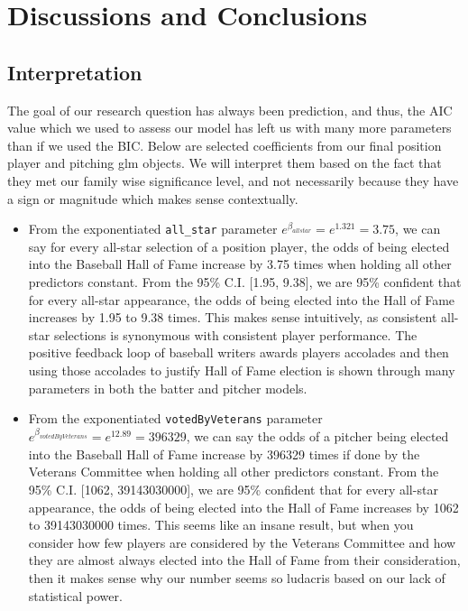 \documentclass[
]{article}
\begin{document}
\hypertarget{discussions-and-conclusions}{%
\section{Discussions and
Conclusions}\label{discussions-and-conclusions}}

\hypertarget{interpretation}{%
\subsection{Interpretation}\label{interpretation}}

The goal of our research question has always been prediction, and thus,
the AIC value which we used to assess our model has left us with many
more parameters than if we used the BIC. Below are selected coefficients
from our final position player and pitching glm objects. We will
interpret them based on the fact that they met our family wise
significance level, and not necessarily because they have a sign or
magnitude which makes sense contextually.

\begin{itemize}
\item
  From the exponentiated \texttt{all\_star} parameter
  \(e^{\beta_{allstar}} = e^{1.321} = 3.75\), we can say for every
  all-star selection of a position player, the odds of being elected
  into the Baseball Hall of Fame increase by 3.75 times when holding all
  other predictors constant. From the 95\% C.I. {[}1.95, 9.38{]}, we are
  95\% confident that for every all-star appearance, the odds of being
  elected into the Hall of Fame increases by 1.95 to 9.38 times. This
  makes sense intuitively, as consistent all-star selections is
  synonymous with consistent player performance. The positive feedback
  loop of baseball writers awards players accolades and then using those
  accolades to justify Hall of Fame election is shown through many
  parameters in both the batter and pitcher models.
\item
  From the exponentiated \texttt{votedByVeterans} parameter
  \(e^{\beta_{votedByVeterans}} = e^{12.89} = 396329\), we can say the
  odds of a pitcher being elected into the Baseball Hall of Fame
  increase by 396329 times if done by the Veterans Committee when
  holding all other predictors constant. From the 95\% C.I. {[}1062,
  39143030000{]}, we are 95\% confident that for every all-star
  appearance, the odds of being elected into the Hall of Fame increases
  by 1062 to 39143030000 times. This seems like an insane result, but
  when you consider how few players are considered by the Veterans
  Committee and how they are almost always elected into the Hall of Fame
  from their consideration, then it makes sense why our number seems so
  ludacris based on our lack of statistical power.
\end{itemize}
\end{document}
